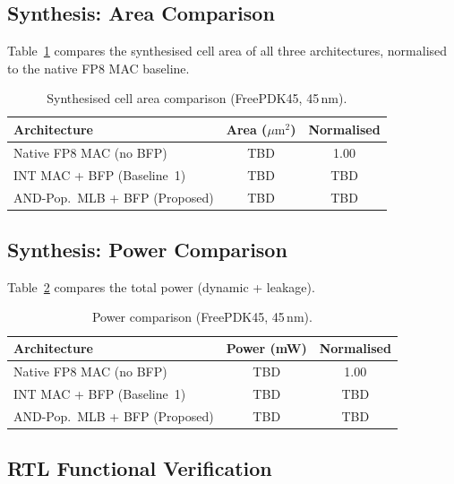 \documentclass[conference]{IEEEtran}
\begin{document}
\subsection{Synthesis: Area Comparison}

Table~\ref{tab:area} compares the synthesised cell area of all three
architectures, normalised to the native FP8 MAC baseline.

\begin{table}[htbp]
\centering
\caption{Synthesised cell area comparison
(FreePDK45, 45\,nm).}
\label{tab:area}
\begin{tabular}{lcc}
\toprule
Architecture & Area ($\mu\text{m}^2$) & Normalised \\
\midrule
Native FP8 MAC (no BFP)    & TBD & 1.00 \\
INT MAC + BFP (Baseline~1) & TBD & TBD \\
AND-Pop.\ MLB + BFP (Proposed) & TBD & TBD \\
\bottomrule
\end{tabular}
\end{table}

\subsection{Synthesis: Power Comparison}

Table~\ref{tab:power} compares the total power (dynamic + leakage).

\begin{table}[htbp]
\centering
\caption{Power comparison
(FreePDK45, 45\,nm).}
\label{tab:power}
\begin{tabular}{lcc}
\toprule
Architecture & Power (mW) & Normalised \\
\midrule
Native FP8 MAC (no BFP)    & TBD & 1.00 \\
INT MAC + BFP (Baseline~1) & TBD & TBD \\
AND-Pop.\ MLB + BFP (Proposed) & TBD & TBD \\
\bottomrule
\end{tabular}
\end{table}


\subsection{RTL Functional Verification}
\end{document}
